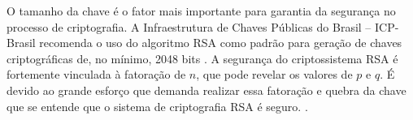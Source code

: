 O tamanho da chave é o fator mais importante para garantia da segurança no processo de criptografia. A Infraestrutura de Chaves Públicas do Brasil – ICP-Brasil recomenda o uso do algoritmo RSA como padrão para geração de chaves criptográficas de, no mínimo, 2048 bits \cite{icp:09}. A segurança do criptossistema RSA é fortemente vinculada à fatoração de $n$, que pode revelar os valores de $p$ e $q$. É devido ao grande esforço que demanda realizar essa fatoração e quebra da chave que se entende que o sistema de criptografia RSA é seguro. \cite{goodrich:13}.